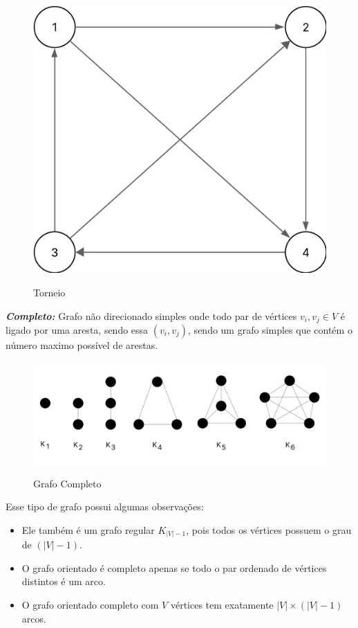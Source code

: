 \begin{figure} [H]
	\centering
	\caption{Torneio}%
	\label{fig:torneio}%
	\includegraphics[width=0.5\linewidth,angle=0]{figuras/tiposgrafos/torneio.png}%
	\\
\end{figure}

\textit{\textbf{Completo:}} Grafo não direcionado simples onde todo par de vértices $v_i, v_j \in V$ é ligado por uma aresta, sendo essa $(v_i, v_j)$, sendo um grafo simples que contém o número maximo possível de arestas.

\begin{figure} [H]
	\centering
	\caption{Grafo Completo}%
	\label{fig:completo}%
	\includegraphics[width=0.8\linewidth,angle=0]{figuras/tiposgrafos/grafo_completo.png}%
	\\
\end{figure}

Esse tipo de grafo possui algumas observações:
\begin{itemize}
    \item Ele também é um grafo regular $K_{|V| - 1}$, pois todos os vértices possuem o grau de $(|V|-1)$.
    \item O grafo orientado é completo apenas se todo o par ordenado de vértices distintos é um arco.
    \item O grafo orientado completo com $V$ vértices tem exatamente $|V|\times(|V|-1)$ arcos.
\end{itemize}


